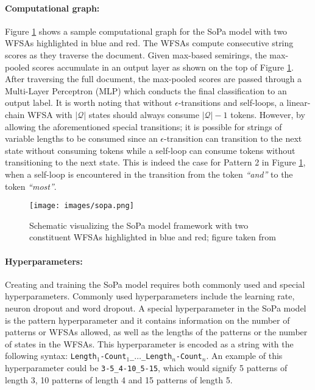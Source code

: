 \paragraph{Computational graph:} Figure \ref{fig:sopa} shows a sample computational graph for the SoPa model with two WFSAs highlighted in blue and red. The WFSAs compute consecutive string scores as they traverse the document. Given max-based semirings, the max-pooled scores accumulate in an output layer as shown on the top of Figure \ref{fig:sopa}. After traversing the full document, the max-pooled scores are passed through a Multi-Layer Perceptron (MLP) which conducts the final classification to an output label. It is worth noting that without $\epsilon$-transitions and self-loops, a linear-chain WFSA with $|\mathcal{Q}|$ states should always consume $\mathcal{|Q|}-1$ tokens. However, by allowing the aforementioned special transitions; it is possible for strings of variable lengths to be consumed since an $\epsilon$-transition can transition to the next state without consuming tokens while a self-loop can consume tokens without transitioning to the next state. This is indeed the case for Pattern 2 in Figure \ref{fig:sopa}, when a self-loop is encountered in the transition from the token \textit{``and''} to the token \textit{``most''}.

\begin{figure}[t]
  \centering
  \texttt{[image: images/sopa.png]}
  \caption{Schematic visualizing the SoPa model framework with two constituent WFSAs highlighted in blue and red; figure taken from \citet{schwartz2018sopa}}
  \label{fig:sopa}
\end{figure}

\paragraph{Hyperparameters:} Creating and training the SoPa model requires both commonly used and special hyperparameters. Commonly used hyperparameters include the learning rate, neuron dropout and word dropout. A special hyperparameter in the SoPa model is the pattern hyperparameter and it contains information on the number of patterns or WFSAs allowed, as well as the lengths of the patterns or the number of states in the WFSAs. This hyperparameter is encoded as a string with the following syntax: \texttt{Length$_{1}$-Count$_{1}$\_$\dots$\_Length$_{n}$-Count$_{n}$}. An example of this hyperparameter could be \texttt{3-5\_4-10\_5-15}, which would signify 5 patterns of length 3, 10 patterns of length 4 and 15 patterns of length 5.

